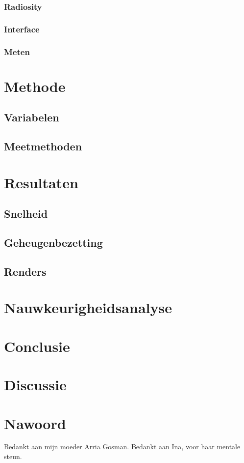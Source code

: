 \documentclass[12pt, a4paper]{article}
\begin{document}
\subsubsection{Radiosity}
\subsubsection{Interface}
\subsubsection{Meten}
\clearpage
\section{Methode}
\subsection{Variabelen}
\subsection{Meetmethoden}
\clearpage
\section{Resultaten}
\subsection{Snelheid}
\subsection{Geheugenbezetting}
\subsection{Renders}
\clearpage
\section{Nauwkeurigheidsanalyse}
\clearpage
\section{Conclusie}
\clearpage
\section{Discussie}
\clearpage
\section{Nawoord}
Bedankt aan mijn moeder Arria Gosman.
Bedankt aan Ina, voor haar mentale steun.
\clearpage
\end{document}
